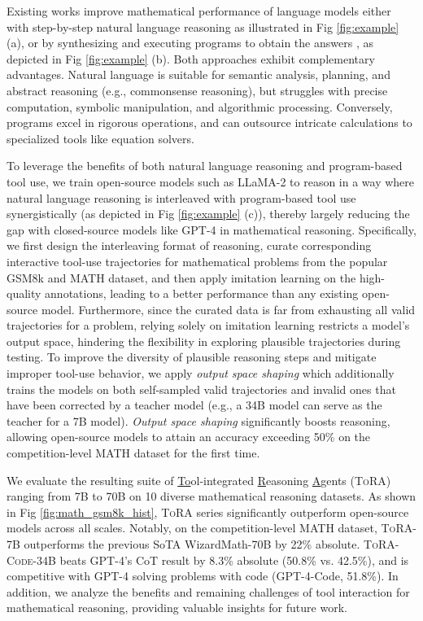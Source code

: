 Existing works improve mathematical performance of language models either with step-by-step natural language reasoning \citep{wei2022chain} as illustrated in Fig \ref{fig:example} (a), or by synthesizing and executing programs to obtain the answers \citep{gao2022pal,chen2022program}, as depicted in Fig \ref{fig:example} (b). Both approaches exhibit complementary advantages. Natural language is suitable for semantic analysis, planning, and abstract reasoning (e.g., commonsense reasoning), but struggles with precise computation, symbolic manipulation, and algorithmic processing. Conversely, programs excel in rigorous operations, and can outsource intricate calculations to specialized tools like equation solvers.

To leverage the benefits of both natural language reasoning and program-based tool use, we train open-source models such as LLaMA-2 to reason in a way where natural language reasoning is interleaved with program-based tool use synergistically (as depicted in Fig \ref{fig:example} (c)), thereby largely reducing the gap with closed-source models like GPT-4 in mathematical reasoning. Specifically, we first design the interleaving format of reasoning, curate corresponding interactive tool-use trajectories for mathematical problems from the popular GSM8k \citep{cobbe2021gsm8k} and MATH \citep{hendrycksmath2021} dataset, and then apply imitation learning on the high-quality annotations, leading to a better performance than any existing open-source model. Furthermore, since the curated data is far from exhausting all valid trajectories for a problem, relying solely on imitation learning restricts a model's output space, hindering the flexibility in exploring plausible trajectories during testing. To improve the diversity of plausible reasoning steps and mitigate improper tool-use behavior, we apply \emph{output space shaping} which additionally trains the models on both self-sampled valid trajectories and invalid ones that have been corrected by a teacher model (e.g., a 34B model can serve as the teacher for a 7B model).
\emph{Output space shaping} significantly boosts reasoning, allowing open-source models to attain an accuracy exceeding 50\% on the competition-level MATH dataset for the first time.

We evaluate the resulting suite of \underline{To}ol-integrated \underline{R}easoning \underline{A}gents (\textsc{ToRA}) ranging from 7B to 70B on 10 diverse mathematical reasoning datasets. As shown in Fig \ref{fig:math_gsm8k_hist}, \textsc{ToRA} series significantly outperform open-source models across all scales. Notably, on the competition-level MATH dataset, \textsc{ToRA}-7B outperforms the previous SoTA WizardMath-70B \citep{luo2023wizardmath} by 22\% absolute.
\textsc{ToRA-Code}-34B beats GPT-4's CoT result \citep{DBLP:journals/corr/abs-2303-12712} by 8.3\% absolute (50.8\% vs. 42.5\%), and is competitive with GPT-4 solving problems with code (GPT-4-Code, 51.8\%).
In addition, we analyze the benefits and remaining challenges of tool interaction for mathematical reasoning, providing valuable insights for future work.


